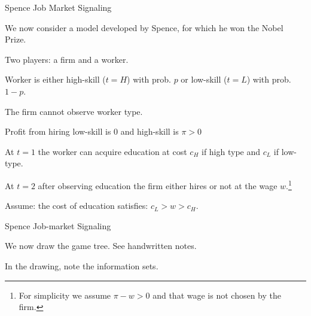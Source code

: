 \documentclass[aspectratio=169]{beamer}
\newenvironment{wideitemize}{\itemize\addtolength{\itemsep}{10pt}}{\enditemize}
\begin{document}
\begin{frame}{Spence Job Market Signaling}

\begin{wideitemize}
    \item We now consider a model developed by Spence, for which he won the Nobel Prize.
    \item Two players: a firm and a worker.
    \item Worker is either high-skill ($t=H$) with prob. $p$ or low-skill ($t=L$) with prob. $1-p$.
    \item The firm cannot observe worker type.
    \item Profit from hiring low-skill is 0 and high-skill is $\pi>0$
    \item At $t=1$ the worker can acquire education at cost $c_H$ if high type and $c_L$ if low-type.
    \item At $t=2$ after observing education the firm either hires or not at the wage $w$.\footnote{For simplicity we assume $\pi -w>0$ and that wage is not chosen by the firm.}
    \item Assume: the cost of education satisfies: $c_L>w>c_H$.
\end{wideitemize}
    
\end{frame}

\begin{frame}{Spence Job-market Signaling}

\begin{wideitemize}
    \item We now draw the game tree. See handwritten notes.
    \item In the drawing, note the information sets.
\end{wideitemize}
    
\end{frame}
\end{document}
